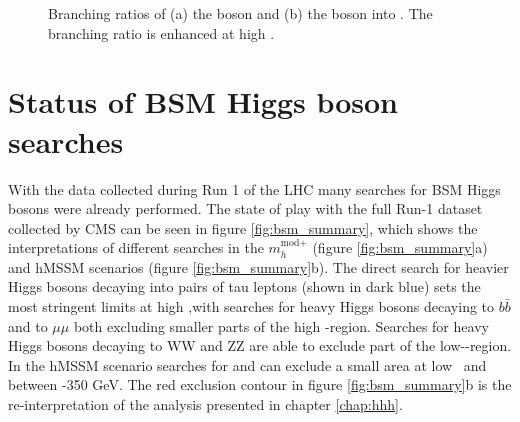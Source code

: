 \begin{figure}[h!]
\begin{center}
\end{center}
\caption{Branching ratios of (a) the \PHiggs boson and (b) the \PHiggsps boson into \tautau. The
branching ratio is enhanced at high \tanb.} 
\label{fig:hmssm_brtautau}
\end{figure}


\section{Status of BSM Higgs boson searches}
\label{sec:theory_BSMH_status}
With the data collected during 
Run 1 of the \ac{LHC} many searches for BSM Higgs
bosons were already performed. The state of play with the full
Run-1 dataset collected by \ac{CMS} can be seen in figure \ref{fig:bsm_summary},
which shows the interpretations of different searches in the $m_{h}^{\text{mod+}}$ (figure \ref{fig:bsm_summary}a)
and hMSSM scenarios (figure \ref{fig:bsm_summary}b). The direct search for heavier Higgs bosons decaying into pairs
of tau leptons (shown in dark blue) sets the most stringent limits at high \tanb,with searches for 
heavy Higgs bosons decaying to $b\bar{b}$ and to $\mu\mu$ both excluding smaller parts of the high \tanb-region.
Searches for heavy Higgs bosons decaying to WW and ZZ are able to exclude part of the low-\tanb-region. In the 
hMSSM scenario searches for \Htohh and \AtoZh can exclude a small area at low \tanb~and between -350 GeV.
The red exclusion contour in figure \ref{fig:bsm_summary}b is the re-interpretation of the analysis presented in
chapter \ref{chap:hhh}.

